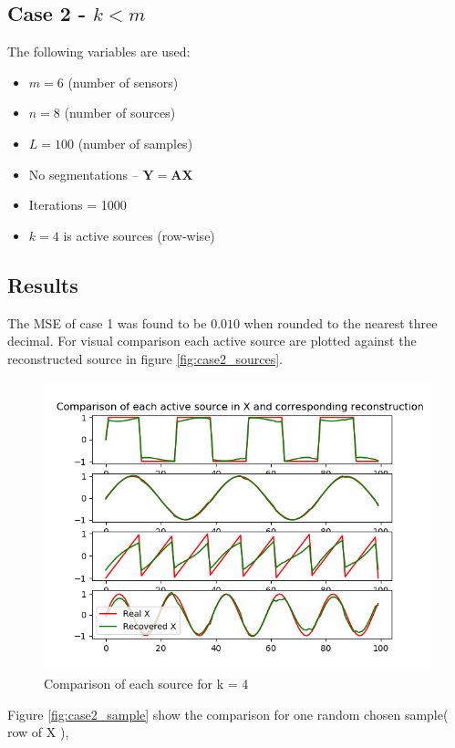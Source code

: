 \subsection*{Case 2 - $k<m$}
The following variables are used: 
\begin{itemize}
\item $m = 6$ (number of sensors)
\item $n = 8$ (number of sources)
\item $L = 100$ (number of samples)
\item No segmentations -- $\mathbf{Y} = \mathbf{AX}$
\item Iterations = 1000
\item $k = 4$ is active sources (row-wise) 
\end{itemize}

\subsection*{Results}
The MSE of case 1 was found to be $0.010$ when rounded to the nearest three decimal.
For visual comparison each active source are plotted against the reconstructed source in figure \ref{fig:case2_sources}. 
\begin{figure}[H]
\centering
\includegraphics[width=\textwidth]{figures/cases/case2_1.png}
\caption{Comparison of each source for k = 4 }
\label{fig:case2_soures}
\end{figure}
\noindent
Figure \ref{fig:case2_sample} show the comparison for one random chosen sample( row of X ),
\\ \\
